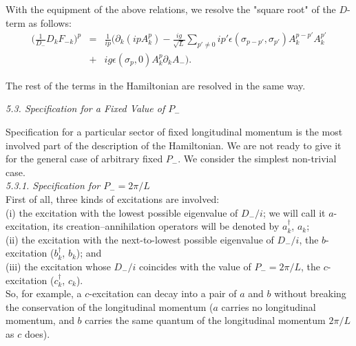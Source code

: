 \documentclass[a4paper,12pt]{article}
\begin{document}
With the equipment of the above relations, we resolve 
the "square root" of the $D$-term as follows:
\begin{eqnarray}
\label{dresolve}
\bigg( \frac{1}{D_-}D_kF_{-k} \bigg)^p 
&  =  & \frac{1}{ip} \bigg(\partial_k (ipA^p_k) - 
    \frac{ig}{\sqrt{L}}
         \sum_{p'\neq 0}ip'\epsilon(\sigma_{p-p'},\sigma_{p'})
A^{p-p'}_kA^{p'}_k \nonumber \\
 & + &  ig\epsilon(\sigma_p,0)A^p_k\partial_kA_- \bigg).
\end{eqnarray}

The rest of the terms in the Hamiltonian are
resolved in the same way.\\


\vspace{.3cm}

{\it 5.3. Specification for a Fixed Value of $P_-$  }\\
\vspace{.3cm}

Specification for a particular sector of fixed longitudinal 
momentum is the most involved part of the description 
of the Hamiltonian. We are not ready to give it for 
the general case of arbitrary fixed $P_-$. We consider the simplest 
non-trivial case.\\

{\it  5.3.1. Specification for $P_- = 2\pi/L$ }\\

First of all, three kinds of excitations are involved: \\
 
(i) the excitation with the 
lowest possible eigenvalue of 
$D_-/i$;  we will call it $a$-excitation, its 
creation--annihilation operators will be denoted by 
$a^\dagger_k$, $a_k$; \\

(ii) the excitation with the next-to-lowest possible eigenvalue 
of $D_-/i$, the $b$-excitation ($b^\dagger_k$, $b_k$); and \\

(iii) the excitation whose $D_-/i$ coincides with the value 
of $P_- = 2\pi/L$, the $c$-excitation ($c^\dagger_k$, $c_k$). \\

So, for example, a $c$-excitation can decay into a pair of $a$ 
and $b$ without breaking the conservation of the longitudinal 
momentum ($a$ carries no longitudinal momentum, and 
$b$ carries the same quantum of the longitudinal 
momentum $2\pi/L$ as $c$ does).  
\end{document}

